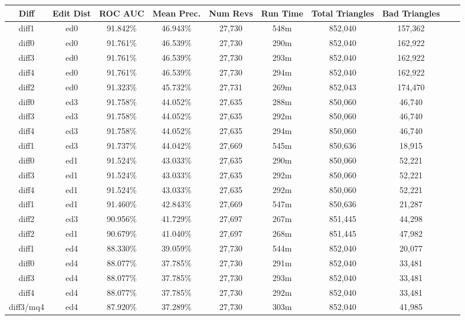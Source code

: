 \begin{sidewaystable}[!tp]
  \begin{center}
    \begin{tabular}{|c|c|c|c||c|c||c|c|c|c|}
\hline
Diff & Edit Dist
        & ROC AUC & Mean Prec.
        & Num Revs & Run Time
        & Total Triangles & Bad Triangles \\
\hline
\hline

diff1 & ed0 & 91.842\% & 46.943\% & 27,730 & 548m & 852,040 & 157,362 \\
diff0 & ed0 & 91.761\% & 46.539\% & 27,730 & 290m & 852,040 & 162,922 \\
diff3 & ed0 & 91.761\% & 46.539\% & 27,730 & 293m & 852,040 & 162,922 \\
diff4 & ed0 & 91.761\% & 46.539\% & 27,730 & 294m & 852,040 & 162,922 \\
diff2 & ed0 & 91.323\% & 45.732\% & 27,731 & 269m & 852,043 & 174,470 \\
diff0 & ed3 & 91.758\% & 44.052\% & 27,635 & 288m & 850,060 & 46,740 \\
diff3 & ed3 & 91.758\% & 44.052\% & 27,635 & 292m & 850,060 & 46,740 \\
diff4 & ed3 & 91.758\% & 44.052\% & 27,635 & 294m & 850,060 & 46,740 \\
diff1 & ed3 & 91.737\% & 44.042\% & 27,669 & 545m & 850,636 & 18,915 \\
diff0 & ed1 & 91.524\% & 43.033\% & 27,635 & 290m & 850,060 & 52,221 \\
diff3 & ed1 & 91.524\% & 43.033\% & 27,635 & 292m & 850,060 & 52,221 \\
diff4 & ed1 & 91.524\% & 43.033\% & 27,635 & 292m & 850,060 & 52,221 \\
diff1 & ed1 & 91.460\% & 42.843\% & 27,669 & 547m & 850,636 & 21,287 \\
diff2 & ed3 & 90.956\% & 41.729\% & 27,697 & 267m & 851,445 & 44,298 \\
diff2 & ed1 & 90.679\% & 41.040\% & 27,697 & 268m & 851,445 & 47,982 \\
diff1 & ed4 & 88.330\% & 39.059\% & 27,730 & 544m & 852,040 & 20,077 \\
diff0 & ed4 & 88.077\% & 37.785\% & 27,730 & 291m & 852,040 & 33,481 \\
diff3 & ed4 & 88.077\% & 37.785\% & 27,730 & 293m & 852,040 & 33,481 \\
diff4 & ed4 & 88.077\% & 37.785\% & 27,730 & 292m & 852,040 & 33,481 \\
diff3/mq4 & ed4 & 87.920\% & 37.289\% & 27,730 & 303m & 852,040 & 41,985 \\

\end{tabular}
\end{center}
\end{sidewaystable}
